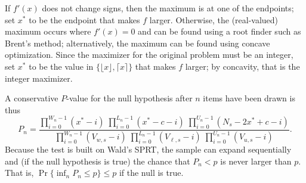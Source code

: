 \documentclass[runningheads]{llncs}
\begin{document}
If $f'(x)$ does not change signs, then the maximum is at one of the endpoints;
set $x^*$ to be the endpoint that makes $f$ larger.
Otherwise, the (real-valued) maximum occurs where $f'(x) = 0$ and can be found using a root finder such as Brent's method; alternatively, the maximum can be found using concave optimization.
Since the maximizer for the original problem must be an integer, set $x^*$ to be the value in $\{\lfloor x \rfloor, \lceil x \rceil\}$ that makes $f$ larger; by concavity, that is the integer maximizer.


A conservative $P$-value for the null hypothesis after $n$ items have been drawn is thus
$$
   P_n =  \frac{\prod_{i=0}^{W_n-1} (x^*-i) \; \prod_{i=0}^{L_n-1}  (x^*-c-i) \; \prod_{i=0}^{U_n-1} (N_s-2x^*+c-i)}{\prod_{i=0}^{W_n-1}(V_{w,s}-i) \; \prod_{i=0}^{L_n-1} (V_{\ell,s}-i) \; \prod_{i=0}^{U_n-1} (V_{u,s}-i)}.
$$
Because the test is built on Wald's SPRT,  the sample can expand sequentially and 
(if the null hypothesis is true) the chance that $P_n < p$ is never larger than $p$.
That is, $\Pr \{ \inf_n P_n \le p \} \le p$ if the null is true.
\end{document}
